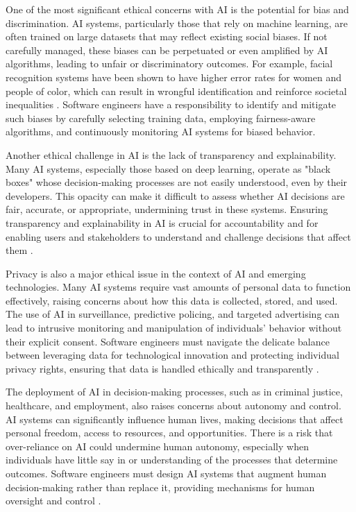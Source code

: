 \begin{refsection}
One of the most significant ethical concerns with AI is the potential for bias and discrimination. AI systems, particularly those that rely on machine learning, are often trained on large datasets that may reflect existing social biases. If not carefully managed, these biases can be perpetuated or even amplified by AI algorithms, leading to unfair or discriminatory outcomes. For example, facial recognition systems have been shown to have higher error rates for women and people of color, which can result in wrongful identification and reinforce societal inequalities \cite[pp.~24-27]{benjamin2019race}. Software engineers have a responsibility to identify and mitigate such biases by carefully selecting training data, employing fairness-aware algorithms, and continuously monitoring AI systems for biased behavior.

Another ethical challenge in AI is the lack of transparency and explainability. Many AI systems, especially those based on deep learning, operate as "black boxes" whose decision-making processes are not easily understood, even by their developers. This opacity can make it difficult to assess whether AI decisions are fair, accurate, or appropriate, undermining trust in these systems. Ensuring transparency and explainability in AI is crucial for accountability and for enabling users and stakeholders to understand and challenge decisions that affect them \cite[pp.~89-91]{mittelstadt2016ethics}.

Privacy is also a major ethical issue in the context of AI and emerging technologies. Many AI systems require vast amounts of personal data to function effectively, raising concerns about how this data is collected, stored, and used. The use of AI in surveillance, predictive policing, and targeted advertising can lead to intrusive monitoring and manipulation of individuals' behavior without their explicit consent. Software engineers must navigate the delicate balance between leveraging data for technological innovation and protecting individual privacy rights, ensuring that data is handled ethically and transparently \cite[pp.~77-80]{zuboff2020age}.

The deployment of AI in decision-making processes, such as in criminal justice, healthcare, and employment, also raises concerns about autonomy and control. AI systems can significantly influence human lives, making decisions that affect personal freedom, access to resources, and opportunities. There is a risk that over-reliance on AI could undermine human autonomy, especially when individuals have little say in or understanding of the processes that determine outcomes. Software engineers must design AI systems that augment human decision-making rather than replace it, providing mechanisms for human oversight and control \cite[pp.~132-135]{eubanks2018automating}.


\end{refsection}
